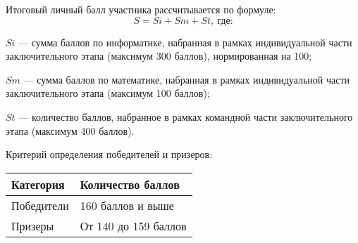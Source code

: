 Итоговый личный балл участника рассчитывается по формуле:
$$S = Si + Sm + St, \: \text{где:}$$

$Si$ — сумма баллов по информатике, набранная в рамках индивидуальной части заключительного этапа (максимум 300 баллов), нормированная на 100;

$Sm$ — сумма баллов по математике, набранная в рамках индивидуальной части заключительного этапа (максимум 100 баллов); 

$St$ — количество баллов, набранное в рамках командной части заключительного этапа (максимум 400 баллов).

Критерий определения победителей и призеров:
\begin{center}
    \begin{tabular}{|l|l|}
        \hline
        Категория&Количество баллов\\
        \hline
        Победители&160 баллов и выше\\
        \hline
        Призеры&От 140 до 159 баллов\\
        \hline
    \end{tabular}
\end{center}